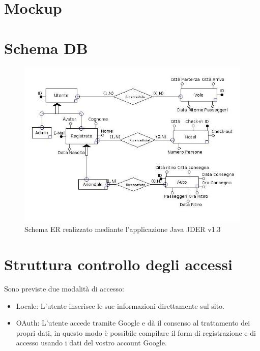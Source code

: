\documentclass[11pt]{article}
\begin{document}
\section{Mockup}
\pagebreak


\section{Schema DB}
\begin{figure}[!ht]
	\includegraphics[width=1.2\textwidth]{progetto} %
	\caption{Schema ER realizzato mediante l'applicazione Java JDER v1.3}
	\label{fig:schemaer}
\end{figure}


\section{Struttura controllo degli accessi}
Sono previste due modalità di accesso:
\begin{itemize}
	\item Locale: L’utente inserisce le sue informazioni direttamente sul sito.
	\item OAuth: L’utente accede tramite Google e dà il consenso al trattamento dei propri dati, in questo modo è possibile compilare il form di registrazione e di accesso usando i dati del vostro account Google.
\end{itemize}
\end{document}
